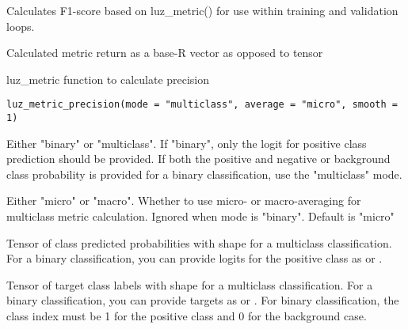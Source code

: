 \documentclass[a4paper]{book}
\begin{document}
%
\begin{Details}\relax
Calculates F1-score based on luz\_metric() for use within training and validation
loops.
\end{Details}
%
\begin{Value}
Calculated metric return as a base-R vector as opposed to tensor
\end{Value}
%
\begin{Description}\relax
luz\_metric function to calculate precision
\end{Description}
%
\begin{Usage}
\begin{verbatim}
luz_metric_precision(mode = "multiclass", average = "micro", smooth = 1)
\end{verbatim}
\end{Usage}
%
\begin{Arguments}
\begin{ldescription}
\item[\code{mode}] Either "binary" or "multiclass". If "binary", only the logit for
positive class prediction should be provided. If both the positive and negative
or background class probability is provided for a binary classification, use
the "multiclass" mode.

\item[\code{average}] Either "micro" or "macro". Whether to use micro- or macro-averaging
for multiclass metric calculation. Ignored when mode is "binary". Default is
"micro"

\item[\code{preds}] Tensor of class predicted probabilities with shape
 for a multiclass classification. For a
binary classification, you can provide logits for the positive class as
 or .

\item[\code{target}] Tensor of target class labels with shape
 for a multiclass classification. For a
binary classification, you can provide targets as
 or . For
binary classification, the class index must be 1 for the positive class and
0 for the background case.
\end{ldescription}
\end{Arguments}
\end{document}
